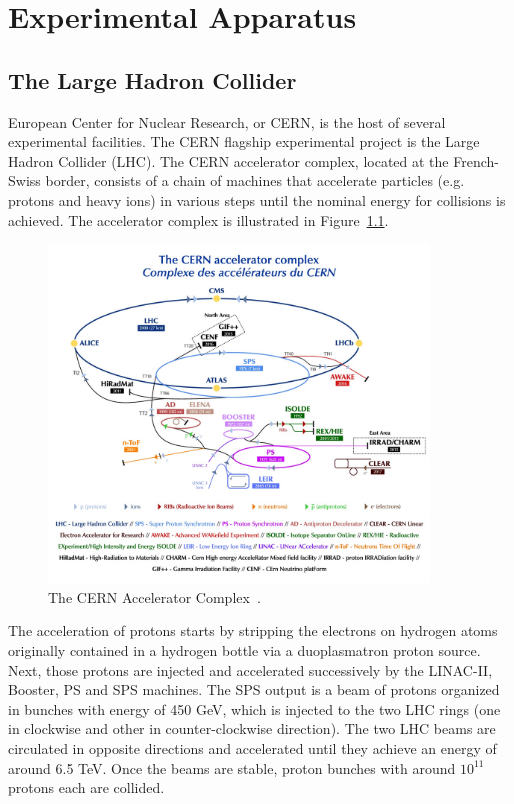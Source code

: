 \chapter{Experimental Apparatus} 
\label{chapter:apparatus}
\section{The Large Hadron Collider}
European Center for Nuclear Research, or CERN, is the host of several experimental facilities. The CERN flagship experimental project is the Large Hadron Collider (LHC).  The CERN accelerator complex, located at the French-Swiss border, consists of a chain of machines that accelerate particles (e.g. protons and heavy ions) in various steps until the nominal energy for collisions is achieved. The accelerator complex is illustrated in Figure~\ref{fig:cernaccelerator}. 

\begin{figure}[ht]
\centering
\includegraphics[width=0.9\textwidth]{Figures/Apparatus/cernmachines.jpg}
\caption[The CERN Accelerator Complex]{The CERN Accelerator Complex~\cite{Mobs:2197559}.}
\label{fig:cernaccelerator}
\end{figure}

The acceleration of protons starts by stripping the electrons on hydrogen atoms originally contained in a hydrogen bottle via a duoplasmatron proton source. Next, those protons are injected and accelerated successively by the LINAC-II, Booster, PS and SPS machines. The SPS output is a beam of protons organized in bunches with energy of 450 GeV, which is injected to the two LHC rings (one in clockwise and other in counter-clockwise direction). The two LHC beams are circulated in opposite directions and accelerated until they achieve an energy of around 6.5 TeV. Once the beams are stable, proton bunches with around $10^{11}$ protons each are collided. 

